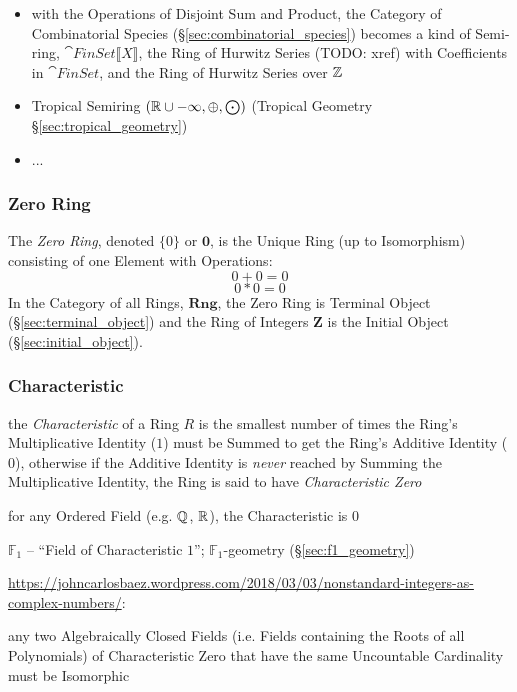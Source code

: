 \begin{itemize}
  \item with the Operations of Disjoint Sum and Product, the
    Category of Combinatorial Species (\S\ref{sec:combinatorial_species})
    becomes a kind of Semi-ring, $\cat{FinSet}\llbracket{X}\rrbracket$, the
    Ring of Hurwitz Series (TODO: xref) with Coefficients in $\cat{FinSet}$, and
    the Ring of Hurwitz Series over $\mathbb{Z}$
  \item Tropical Semiring $(\mathbb{R} \cup -\infty, \oplus, \bigodot)$ (Tropical
    Geometry \S\ref{sec:tropical_geometry})
  \item ...
\end{itemize}



\subsubsection{Zero Ring}\label{sec:zero_ring}

The \emph{Zero Ring}, denoted $\{0\}$ or $\mathbf{0}$, is the Unique Ring
(up to Isomorphism) consisting of one Element with Operations:
\[
    0 + 0 = 0
\] \[
    0 * 0 = 0
\]
In the Category of all Rings, $\mathbf{Rng}$, the Zero Ring is
Terminal Object (\S\ref{sec:terminal_object}) and the Ring of Integers
$\mathbf{Z}$ is the Initial Object (\S\ref{sec:initial_object}).



\subsubsection{Characteristic}\label{sec:ring_characteristic}

the \emph{Characteristic} of a Ring $R$ is the smallest number of times the
Ring's Multiplicative Identity ($1$) must be Summed to get the Ring's Additive
Identity ($0$), otherwise if the Additive Identity is \emph{never} reached by
Summing the Multiplicative Identity, the Ring is said to have
\emph{Characteristic Zero}

for any Ordered Field (e.g. $\mathbb{Q}$, $\mathbb{R}$), the Characteristic is $0$

\fist $\mathbb{F}_1$ -- ``Field of Characteristic $1$''; $\mathbb{F}_1$-geometry
(\S\ref{sec:f1_geometry})

\url{https://johncarlosbaez.wordpress.com/2018/03/03/nonstandard-integers-as-complex-numbers/}:

any two Algebraically Closed Fields (i.e. Fields containing the Roots of all
Polynomials) of Characteristic Zero that have the same Uncountable Cardinality
must be Isomorphic

